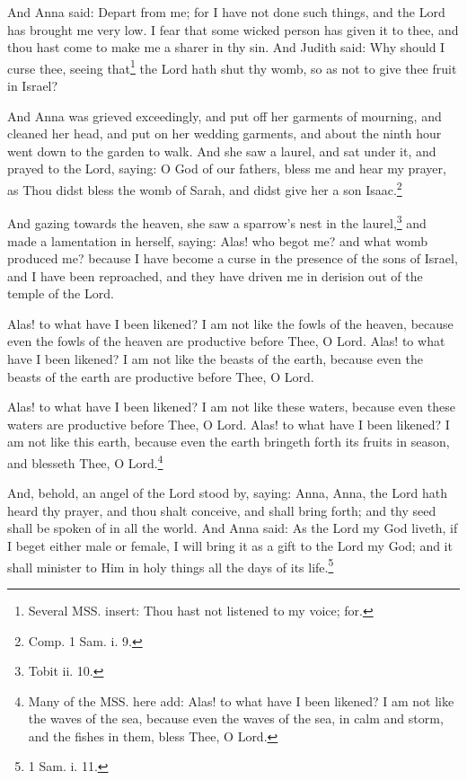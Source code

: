 \pend\pstart
And Anna said: Depart from me; for I have not done such things, and the Lord has brought me very low. I fear that some wicked person has given it to thee, and thou hast come to make me a sharer in thy sin. And Judith said: Why should I curse thee, seeing that\footnote{Several MSS. insert: Thou hast not listened to my voice; for.} the Lord hath shut thy womb, so as not to give thee fruit in Israel?

\pend\pstart
And Anna was grieved exceedingly, and put off her garments of mourning, and cleaned her head, and put on her wedding garments, and about the ninth hour went down to the garden to walk. And she saw a laurel, and sat under it, and prayed to the Lord, saying: O God of our fathers, bless me and hear my prayer, as Thou didst bless the womb of Sarah, and didst give her a son Isaac.\footnote{Comp. 1 Sam. i. 9.}

\pend\pstart
{}

\pend\setcounter{pstartR}{1}\pstart
And gazing towards the heaven, she saw a sparrow's nest in the laurel,\footnote{Tobit ii. 10.} and made a lamentation in herself, saying: Alas! who begot me? and what womb produced me? because I have become a curse in the presence of the sons of Israel, and I have been reproached, and they have driven me in derision out of the temple of the Lord.

\pend\pstart
Alas! to what have I been likened? I am not like the fowls of the heaven, because even the fowls of the heaven are productive before Thee, O Lord. Alas! to what have I been likened? I am not like the beasts of the earth, because even the beasts of the earth are productive before Thee, O Lord.

\pend\pstart
Alas! to what have I been likened? I am not like these waters, because even these waters are productive before Thee, O Lord. Alas! to what have I been likened? I am not like this earth, because even the earth bringeth forth its fruits in season, and blesseth Thee, O Lord.\footnote{Many of the MSS. here add: Alas! to what have I been likened? I am not like the waves of the sea, because even the waves of the sea, in calm and storm, and the fishes in them, bless Thee, O Lord.}

\pend\pstart
{}

\pend\setcounter{pstartR}{1}\pstart
And, behold, an angel of the Lord stood by, saying: Anna, Anna, the Lord hath heard thy prayer, and thou shalt conceive, and shall bring forth; and thy seed shall be spoken of in all the world. And Anna said: As the Lord my God liveth, if I beget either male or female, I will bring it as a gift to the Lord my God; and it shall minister to Him in holy things all the days of its life.\footnote{1 Sam. i. 11.}

